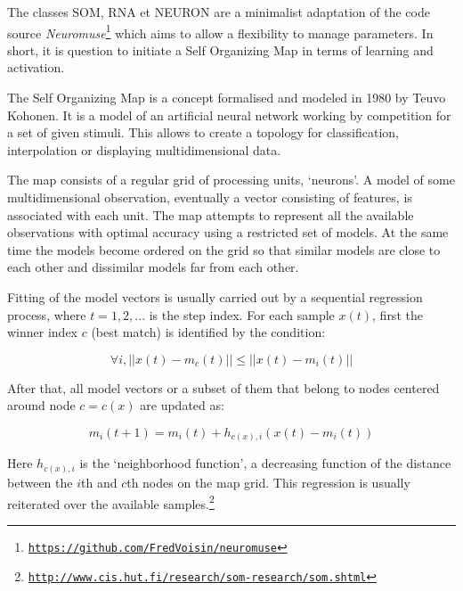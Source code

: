 The classes SOM, RNA et NEURON are a minimalist adaptation of the code source \textsl{Neuromuse}\footnote{\href{https://github.com/FredVoisin/neuromuse}{\texttt{\scriptsize https://github.com/FredVoisin/neuromuse}}} which aims to allow a flexibility to manage parameters. In short, it is question to initiate a Self Organizing Map in terms of learning and activation. 

\bigskip

The Self Organizing Map is a concept formalised and modeled in 1980 by Teuvo Kohonen. It is a model of an artificial neural network working by competition for a set of given stimuli. This allows to create a topology for classification, interpolation or displaying multidimensional data.

\bigskip

\begin{displayquote}
The map consists of a regular grid of processing units, `neurons'. A model of some multidimensional observation, eventually a vector consisting of features, is associated with each unit. The map attempts to represent all the available observations with optimal accuracy using a restricted set of models. At the same time the models become ordered on the grid so that similar models are close to each other and dissimilar models far from each other. 

\smallskip 

Fitting of the model vectors is usually carried out by a sequential regression process, where $t = 1,2,...$ is the step index. For each sample $x(t)$, first the winner index $c$ (best match) is identified by the condition:

$$\forall i, || x(t) - m_c(t) || \leq || x(t) - m_i(t) ||$$

After that, all model vectors or a subset of them that belong to nodes centered around node $c = c(x)$ are updated as:

$$m_i(t + 1) = m_i(t) + h_{c(x),i}(x(t) - m_i(t))$$

Here $h_{c(x),i}$ is the `neighborhood function', a decreasing function of the distance between the $i$th and $c$th nodes on the map grid. This regression is usually reiterated over the available samples.\footnote{\href{http://www.cis.hut.fi/research/som-research/som.shtml}{\texttt{\scriptsize http://www.cis.hut.fi/research/som-research/som.shtml}}}
\end{displayquote}

%

